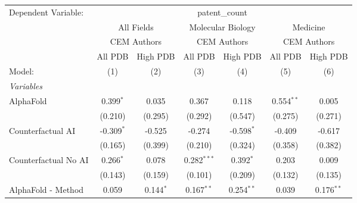 \begingroup
\centering
\begin{tabular}{lcccccc}
   \tabularnewline \midrule \midrule
   Dependent Variable: & \multicolumn{6}{c}{patent\_count}\\
 & \multicolumn{2}{c}{All Fields} & \multicolumn{2}{c}{Molecular Biology} & \multicolumn{2}{c}{Medicine} \\
\cmidrule(lr){2-3} \cmidrule(lr){4-5} \cmidrule(lr){6-7}
 & \multicolumn{2}{c}{CEM Authors} & \multicolumn{2}{c}{CEM Authors} & \multicolumn{2}{c}{CEM Authors} \\
\cmidrule(lr){2-3} \cmidrule(lr){4-5} \cmidrule(lr){6-7}
 & \multicolumn{1}{c}{All PDB} & \multicolumn{1}{c}{High PDB} & \multicolumn{1}{c}{All PDB} & \multicolumn{1}{c}{High PDB} & \multicolumn{1}{c}{All PDB} & \multicolumn{1}{c}{High PDB} \\
\cmidrule(lr){2-2} \cmidrule(lr){3-3} \cmidrule(lr){4-4} \cmidrule(lr){5-5} \cmidrule(lr){6-6} \cmidrule(lr){7-7}
   Model:                                                     & (1)           & (2)          & (3)            & (4)           & (5)            & (6)\\  
   \midrule
   \emph{Variables}\\
   AlphaFold                                                  & 0.399$^{*}$   & 0.035        & 0.367          & 0.118         & 0.554$^{**}$   & 0.005\\   
                                                              & (0.210)       & (0.295)      & (0.292)        & (0.547)       & (0.275)        & (0.271)\\   
   Counterfactual AI                                          & -0.309$^{*}$  & -0.525       & -0.274         & -0.598$^{*}$  & -0.409         & -0.617\\   
                                                              & (0.165)       & (0.399)      & (0.210)        & (0.324)       & (0.358)        & (0.382)\\   
   Counterfactual No AI                                       & 0.266$^{*}$   & 0.078        & 0.282$^{***}$  & 0.392$^{*}$   & 0.203          & 0.009\\   
                                                              & (0.143)       & (0.159)      & (0.101)        & (0.209)       & (0.132)        & (0.135)\\   
   AlphaFold - Method                                         & 0.059         & 0.144$^{*}$  & 0.167$^{**}$   & 0.254$^{**}$  & 0.039          & 0.176$^{**}$\\   

\end{tabular}
